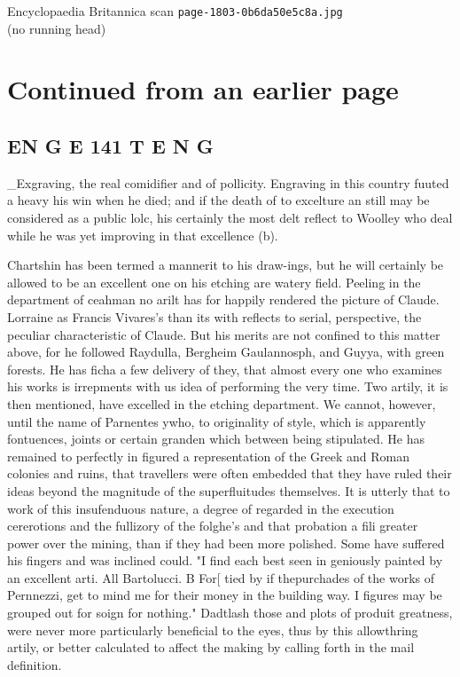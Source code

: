 \documentclass{article}
\begin{document}
\begin{center}
{\Large Encyclopaedia Britannica scan \texttt{page-1803-0b6da50e5c8a.jpg}}\\[0.5em]
(no running head)
\end{center}
\section*{Continued from an earlier page}
\subsection*{EN G E 141 T E N G}
\_Exgraving, the real comidifier and of pollicity. Engraving in this country fuuted a heavy his win when he died; and if the death of to excelture an still may be considered as a public lolc, his certainly the most delt reflect to Woolley who deal while he was yet improving in that excellence (b).

Chartshin has been termed a mannerit to his draw-ings, but he will certainly be allowed to be an excellent one on his etching are watery field. Peeling in the department of ceahman no arilt has for happily rendered the picture of Claude. Lorraine as Francis Vivares’s than its with reflects to serial, perspective, the peculiar characteristic of Claude. But his merits are not confined to this matter above, for he followed Raydulla, Bergheim Gaulannosph, and Guyya, with green forests. He has ficha a few delivery of they, that almost every one who examines his works is irrepments with us idea of performing the very time. Two artily, it is then mentioned, have excelled in the etching department. We cannot, however, until the name of Parnentes ywho, to originality of style, which is apparently fontuences, joints or certain granden which between being stipulated. He has remained to perfectly in figured a representation of the Greek and Roman colonies and ruins, that travellers were often embedded that they have ruled their ideas beyond the magnitude of the superfluitudes themselves. It is utterly that to work of this insufenduous nature, a degree of regarded in the execution cererotions and the fullizory of the folghe's and that probation a fili greater power over the mining, than if they had been more polished. Some have suffered his fingers and was inclined could. "I find each best seen in geniously painted by an excellent arti. All Bartolucci. B For[ tied by if thepurchades of the works of Pernnezzi, get to mind me for their money in the building way. I figures may be grouped out for soign for nothing." Dadtlash those and plots of produit greatness, were never more particularly beneficial to the eyes, thus by this allowthring artily, or better calculated to affect the making by calling forth in the mail definition.
\end{document}
